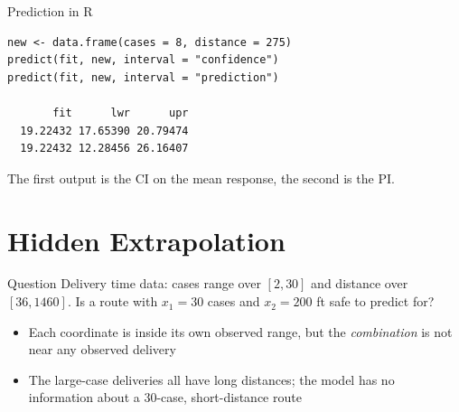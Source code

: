 \begin{frame}[fragile]{Prediction in R}
    \begin{verbatim}
new <- data.frame(cases = 8, distance = 275)
predict(fit, new, interval = "confidence")
predict(fit, new, interval = "prediction")

       fit      lwr      upr
  19.22432 17.65390 20.79474
  19.22432 12.28456 26.16407
    \end{verbatim}
    The first output is the CI on the mean response, the second is the PI.
\end{frame}



\section{Hidden Extrapolation}


\begin{frame}{Question}
    Delivery time data: cases range over $[2, 30]$ and distance over $[36, 1460]$. Is a route with $x_1 = 30$ cases and $x_2 = 200$ ft safe to predict for?
    
    \pause

    \begin{itemize}
        \item Each coordinate is inside its own observed range, but the \emph{combination} is not near any observed delivery
        \item The large-case deliveries all have long distances; the model has no information about a 30-case, short-distance route
    \end{itemize}
\end{frame}


